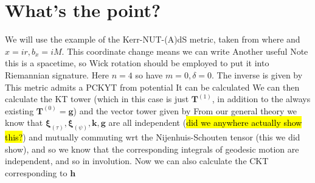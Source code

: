 \documentclass{article}
\begin{document}
\section{What's the point?}

We will use the example of the Kerr-NUT-(A)dS metric, taken from \cite{Frolov2017BlackIntegrability}
where 
and $x = ir, b_x = iM$. This coordinate change means we can write 
Another useful  Note this is a spacetime, so Wick rotation should be employed to put it into Riemannian signature. Here $n=4$ so have $m=0, \delta = 0$. The inverse is given by 
This metric admits a PCKYT 
from potential 
It can be calculated
We can then calculate the KT tower (which in this case is just $\bm{T}^{(1)}$, in addition to the always existing $\bm{T}^{(0)} = \bm{g}$)
and the vector tower given by 
From our general theory we know that $\bm{\xi}_{(\tau)}, \bm{\xi}_{(\psi)}, \bm{k}, \bm{g}$ are all independent (\hl{did we anywhere actually show this?}) and mutually commuting wrt the Nijenhuis-Schouten tensor (this we did show), and so we know that the corresponding integrals of geodesic motion are independent, and so in involution. 
Now we can also calculate the CKT corresponding to $\bm{h}$
\end{document}
